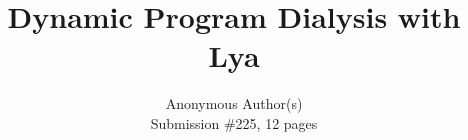 \documentclass[letterpaper,twocolumn,10pt]{article}
\begin{document}

\date{}

\title{\Large \bf Dynamic Program Dialysis with Lya}

\author{
{\rm Anonymous Author(s)}\\
\normalsize{Submission \#225, 12 pages}\\
}

\maketitle
\end{document}
